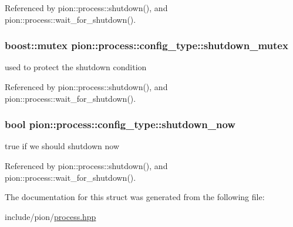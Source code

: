 Referenced by pion\-::process\-::shutdown(), and pion\-::process\-::wait\-\_\-for\-\_\-shutdown().

\hypertarget{structpion_1_1process_1_1config__type_aeea8f463fcb510add8cab8e5fa20f0e4}{
\subsubsection[{shutdown\-\_\-mutex}]{\setlength{\rightskip}{0pt plus 5cm}boost\-::mutex pion\-::process\-::config\-\_\-type\-::shutdown\-\_\-mutex}}\label{structpion_1_1process_1_1config__type_aeea8f463fcb510add8cab8e5fa20f0e4}


used to protect the shutdown condition 



Referenced by pion\-::process\-::shutdown(), and pion\-::process\-::wait\-\_\-for\-\_\-shutdown().

\hypertarget{structpion_1_1process_1_1config__type_aea142e63e9a962ffefb5c0d2091ed303}{
\subsubsection[{shutdown\-\_\-now}]{\setlength{\rightskip}{0pt plus 5cm}bool pion\-::process\-::config\-\_\-type\-::shutdown\-\_\-now}}\label{structpion_1_1process_1_1config__type_aea142e63e9a962ffefb5c0d2091ed303}


true if we should shutdown now 



Referenced by pion\-::process\-::shutdown(), and pion\-::process\-::wait\-\_\-for\-\_\-shutdown().



The documentation for this struct was generated from the following file\-:\begin{DoxyCompactItemize}
\item 
include/pion/\hyperlink{process_8hpp}{process.\-hpp}\end{DoxyCompactItemize}
